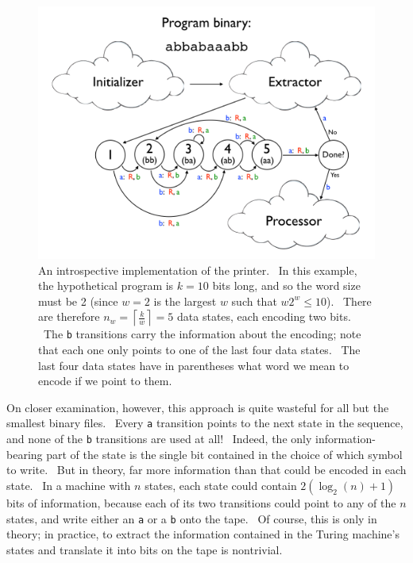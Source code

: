 \documentclass[11pt]{article}
\begin{document}
\begin{figure}
\begin{center}
\includegraphics[scale=0.28]{figs/introspectprog.png}
\caption{An introspective implementation of the printer. \ In this example, the hypothetical program is $k=10$ bits long, and so the word size must be 2 (since $w=2$ is the largest $w$ such that $w2^w \le 10$). \ There are therefore $n_w = \left \lceil{\frac{k}{w}}\right \rceil = 5$ data states, each encoding two bits. \ The \texttt{b} transitions carry the information about the encoding; note that each one only points to one of the last four data states. \ The last four data states have in parentheses what word we mean to encode if we point to them. \label{fig:introspectprog}}
\end{center}
\end{figure}

On closer examination, however, this approach is quite wasteful for all but the smallest binary files. \ Every \texttt{a} transition points to the next state in the sequence, and none of the \texttt{b} transitions are used at all! \ Indeed, the only information-bearing part of the state is the single bit contained in the choice of which symbol to write. \ But in theory, far more information than that could be encoded in each state. \ In a machine with $n$ states, each state could contain $2(\log_2(n) + 1)$ bits of information, because each of its two transitions could point to any of the $n$ states, and write either an \texttt{a} or a \texttt{b} onto the tape. \ Of course, this is only in theory; in practice, to extract the information contained in the Turing machine's states and translate it into bits on the tape is nontrivial.
\end{document}

